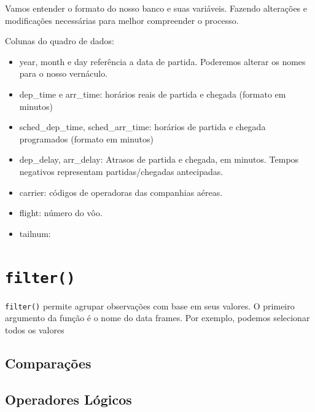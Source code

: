 \documentclass[]{book}
\newenvironment{Shaded}{\begin{snugshade}}{\end{snugshade}}
\newcommand{\DataTypeTok}[1]{\textcolor[rgb]{0.13,0.29,0.53}{#1}}
\newcommand{\KeywordTok}[1]{\textcolor[rgb]{0.13,0.29,0.53}{\textbf{#1}}}
\newcommand{\NormalTok}[1]{#1}
\newcommand{\OperatorTok}[1]{\textcolor[rgb]{0.81,0.36,0.00}{\textbf{#1}}}
\newcommand{\StringTok}[1]{\textcolor[rgb]{0.31,0.60,0.02}{#1}}
\begin{document}
Vamos entender o formato do nosso banco e suas variáveis. Fazendo alterações e modificações necessárias para melhor compreender o processo.

Colunas do quadro de dados:

\begin{itemize}
\item
  year, month e day referência a data de partida. Poderemos alterar os nomes para o nosso vernáculo.
\item
  dep\_time e arr\_time: horários reais de partida e chegada (formato em minutos)
\item
  sched\_dep\_time, sched\_arr\_time: horários de partida e chegada programados (formato em minutos)
\item
  dep\_delay, arr\_delay: Atrasos de partida e chegada, em minutos. Tempos negativos representam partidas/chegadas antecipadas.
\item
  carrier: códigos de operadoras das companhias aéreas.
\item
  flight: número do vôo.
\item
  tailnum:
\end{itemize}

\begin{Shaded}
\end{Shaded}

\hypertarget{filter-1}{%
\section{\texorpdfstring{\texttt{filter()}}{filter()}}\label{filter-1}}

\texttt{filter()} permite agrupar observações com base em seus valores. O primeiro argumento da função é o nome do data frames. Por exemplo, podemos selecionar todos os valores

\hypertarget{comparauxe7uxf5es}{%
\subsection{Comparações}\label{comparauxe7uxf5es}}

\hypertarget{operadores-luxf3gicos}{%
\subsection{Operadores Lógicos}\label{operadores-luxf3gicos}}
\end{document}
